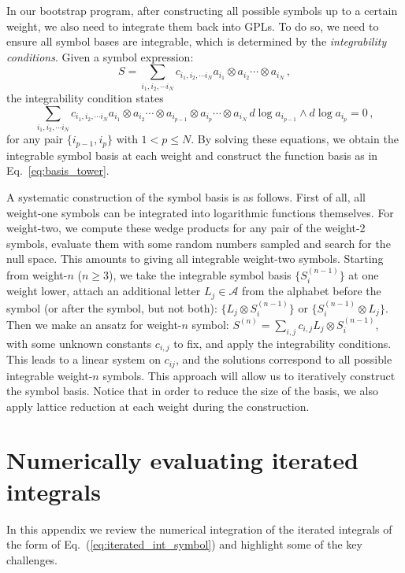 \documentclass[a4paper,11pt]{article}
\begin{document}
In our bootstrap program, after constructing all possible symbols up to a certain weight, we also need to integrate them back into GPLs. To do so, we need to ensure all symbol bases are integrable, which is determined by the {\it integrability conditions}. Given a symbol expression:
\begin{equation}
    S=\sum_{i_1,i_2,\cdots i_N}c_{i_1,i_2,\cdots i_N} a_{i_1}\otimes a_{i_2}\cdots \otimes a_{i_N}\,,
\end{equation}
the integrability condition states
\begin{equation}
    \sum_{i_1,i_2,\cdots i_N}c_{i_1,i_2,\cdots i_N} a_{i_1}\otimes a_{i_2}\cdots \otimes a_{i_{p-1}}\otimes a_{i_{p}}\cdots \otimes a_{i_N} \, d\log a_{i_{p-1}} \wedge d\log a_{i_p} =0\,,
\end{equation}
for any pair $\{i_{p-1},i_p\}$ with $1<p\leq N$. By solving these equations, we obtain the integrable symbol basis at each weight and construct the function basis as in Eq.~\eqref{eq:basis_tower}. 

A systematic construction of the symbol basis is as follows. First of all, all weight-one symbols can be integrated into logarithmic functions themselves. For weight-two, we compute these wedge products for any pair of the weight-2 symbols, evaluate them with some random numbers sampled and search for the null space. This amounts to giving all integrable weight-two symbols. Starting from weight-$n$ ($n\geq 3$), we take the integrable symbol basis $\{S^{(n-1)}_i\}$ at one weight lower, attach an additional letter $L_j\in \mathcal{A}$ from the alphabet before the symbol (or after the symbol, but not both): $\{L_j\otimes S^{(n-1)}_i\}$ or $\{S^{(n-1)}_i\otimes L_j\}$. Then we make an ansatz for weight-$n$ symbol: $S^{(n)}=\sum_{i,j}c_{i,j}L_j\otimes S^{(n-1)}_i$, with some unknown constants $c_{i,j}$ to fix, and apply the integrability conditions. This leads to a linear system on $c_{ij}$, and the solutions correspond to all possible integrable weight-$n$ symbols. This approach will allow us to iteratively construct the symbol basis. Notice that in order to reduce the size of the basis, we also apply lattice reduction at each weight during the construction. 

\section{Numerically evaluating iterated integrals}\label{sec:app_iterated_integrals}
In this appendix we review the numerical integration of the iterated integrals of the form of Eq.~(\ref{eq:iterated_int_symbol}) and highlight some of the key challenges. 
\end{document}

